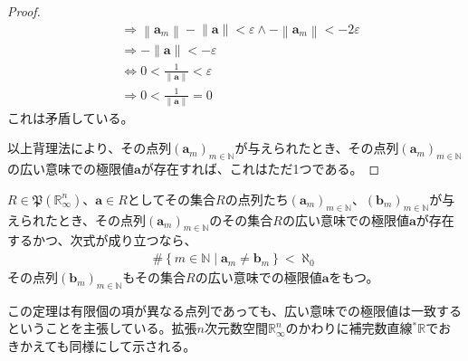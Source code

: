 \documentclass[dvipdfmx]{jsarticle}
\begin{document}
\begin{proof}
\begin{align*}
&\Rightarrow \left\| \mathbf{a}_{m} \right\| - \left\| \mathbf{a} \right\| < \varepsilon \land - \left\| \mathbf{a}_{m} \right\| < - 2\varepsilon\\
&\Rightarrow - \left\| \mathbf{a} \right\| < - \varepsilon\\
&\Leftrightarrow 0 < \frac{1}{\left\| \mathbf{a} \right\|} < \varepsilon\\
&\Rightarrow 0 < \frac{1}{\left\| \mathbf{a} \right\|} = 0
\end{align*}
これは矛盾している。\par
以上背理法により、その点列$\left( \mathbf{a}_{m} \right)_{m \in \mathbb{N}}$が与えられたとき、その点列$\left( \mathbf{a}_{m} \right)_{m \in \mathbb{N}}$の広い意味での極限値$\mathbf{a}$が存在すれば、これはただ1つである。
\end{proof}
\begin{thm}\label{4.1.4.3}
$R \in \mathfrak{P}\left( \mathbb{R}_{\infty}^{n} \right)$、$\mathbf{a} \in R$としてその集合$R$の点列たち$\left( \mathbf{a}_{m} \right)_{m \in \mathbb{N}}$、$\left( \mathbf{b}_{m} \right)_{m \in \mathbb{N}}$が与えられたとき、その点列$\left( \mathbf{a}_{m} \right)_{m \in \mathbb{N}}$のその集合$R$の広い意味での極限値$\mathbf{a}$が存在するかつ、次式が成り立つなら、
\begin{align*}
\#\left\{ m \in \mathbb{N} \middle| \mathbf{a}_{m} \neq \mathbf{b}_{m} \right\} < \aleph_{0}
\end{align*}
その点列$\left( \mathbf{b}_{m} \right)_{m \in \mathbb{N}}$もその集合$R$の広い意味での極限値$\mathbf{a}$をもつ。\par
この定理は有限個の項が異なる点列であっても、広い意味での極限値は一致するということを主張している。拡張$n$次元数空間$\mathbb{R}_{\infty}^{n}$のかわりに補完数直線${}^{*}\mathbb{R}$でおきかえても同様にして示される。
\end{thm}
\end{document}
